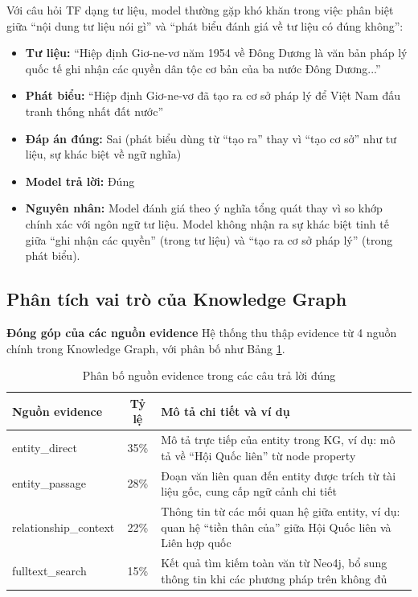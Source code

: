 Với câu hỏi TF dạng tư liệu, model thường gặp khó khăn trong việc phân biệt giữa ``nội dung tư liệu nói gì'' và ``phát biểu đánh giá về tư liệu có đúng không'':

\begin{itemize}
    \item \textbf{Tư liệu:} ``Hiệp định Giơ-ne-vơ năm 1954 về Đông Dương là văn bản pháp lý quốc tế ghi nhận các quyền dân tộc cơ bản của ba nước Đông Dương...''
    \item \textbf{Phát biểu:} ``Hiệp định Giơ-ne-vơ đã tạo ra cơ sở pháp lý để Việt Nam đấu tranh thống nhất đất nước''
    \item \textbf{Đáp án đúng:} Sai (phát biểu dùng từ ``tạo ra'' thay vì ``tạo cơ sở'' như tư liệu, sự khác biệt về ngữ nghĩa)
    \item \textbf{Model trả lời:} Đúng
    \item \textbf{Nguyên nhân:} Model đánh giá theo ý nghĩa tổng quát thay vì so khớp chính xác với ngôn ngữ tư liệu. Model không nhận ra sự khác biệt tinh tế giữa ``ghi nhận các quyền'' (trong tư liệu) và ``tạo ra cơ sở pháp lý'' (trong phát biểu).
\end{itemize}

\subsection{Phân tích vai trò của Knowledge Graph}

\textbf{Đóng góp của các nguồn evidence}
Hệ thống thu thập evidence từ 4 nguồn chính trong Knowledge Graph, với phân bố như Bảng \ref{tab:evidence-sources}.

\begin{table}[H]
\centering
\caption{Phân bố nguồn evidence trong các câu trả lời đúng}
\label{tab:evidence-sources}
\begin{tabular}{|l|c|p{7cm}|}
\hline
\textbf{Nguồn evidence} & \textbf{Tỷ lệ} & \textbf{Mô tả chi tiết và ví dụ} \\
\hline
entity\_direct & 35\% & Mô tả trực tiếp của entity trong KG, ví dụ: mô tả về ``Hội Quốc liên'' từ node property \\
\hline
entity\_passage & 28\% & Đoạn văn liên quan đến entity được trích từ tài liệu gốc, cung cấp ngữ cảnh chi tiết \\
\hline
relationship\_context & 22\% & Thông tin từ các mối quan hệ giữa entity, ví dụ: quan hệ ``tiền thân của'' giữa Hội Quốc liên và Liên hợp quốc \\
\hline
fulltext\_search & 15\% & Kết quả tìm kiếm toàn văn từ Neo4j, bổ sung thông tin khi các phương pháp trên không đủ \\
\hline
\end{tabular}
\end{table}

